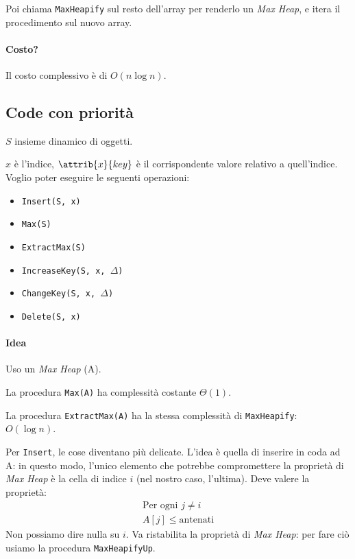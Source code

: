 Poi chiama \texttt{MaxHeapify} sul resto dell'array per renderlo un \emph{Max Heap}, e itera il procedimento 
sul nuovo array.



\paragraph{Costo?} Il costo complessivo è di $O(n \log n)$.

\subsection{Code con priorità} \label{codeconpriorita}
$S$ insieme dinamico di oggetti. \par
$x$ è l'indice, $\attrib{x}{key}$ è il corrispondente valore relativo a quell'indice.
Voglio poter eseguire le seguenti operazioni:
\begin{itemize}[noitemsep]
	\item \texttt{Insert(S, x)}
	\item \texttt{Max(S)}
	\item \texttt{ExtractMax(S)}
	\item \texttt{IncreaseKey(S, x, $\Delta$)}
	\item \texttt{ChangeKey(S, x, $\Delta$)}
	\item \texttt{Delete(S, x)}
\end{itemize}
\paragraph{Idea} Uso un \emph{Max Heap} (A).


La procedura \texttt{Max(A)} ha complessità costante $\Theta (1)$.


La procedura \texttt{ExtractMax(A)} ha la stessa complessità di \texttt{MaxHeapify}: \\
$O(\log n)$.
\bigskip

Per \texttt{Insert}, le cose diventano più delicate. L'idea è quella di inserire
in coda ad A: in questo modo, l'unico elemento che potrebbe compromettere la proprietà di 
\emph{Max Heap} è la cella di indice $i$ (nel nostro caso, l'ultima). Deve valere la proprietà:
\begin{gather*}
	\text{Per ogni } j \neq i \\
	A[j] \leq \text{antenati}
\end{gather*}
Non possiamo dire nulla su $i$. Va ristabilita la proprietà di \emph{Max Heap}: per fare ciò 
usiamo la procedura \texttt{MaxHeapifyUp}.


